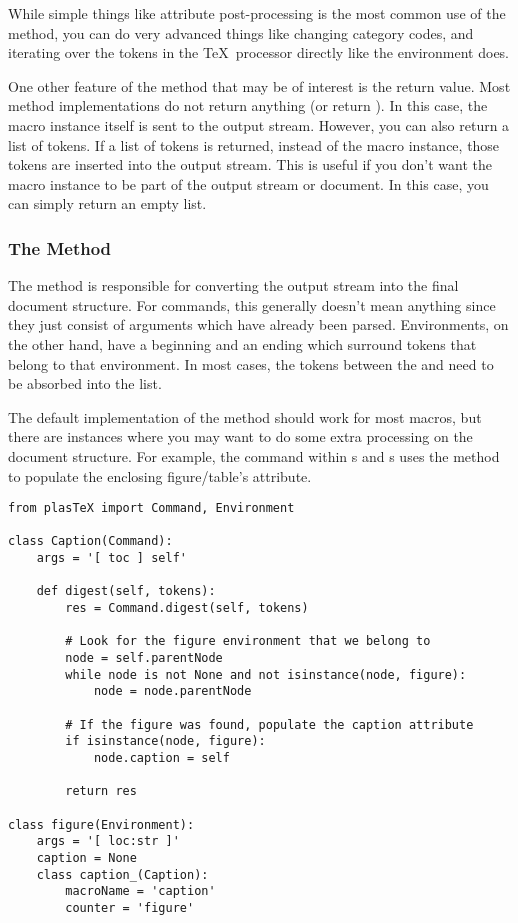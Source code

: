 While simple things like attribute post-processing is the most common
use of the  method, you can do very advanced things
like changing category codes, and iterating over the tokens in the
\TeX\ processor directly like the  environment
does.

One other feature of the  method that may be of interest
is the return value.  Most  method implementations do
not return anything (or return ).  In this case, the macro
instance itself is sent to the output stream.  However, you can also
return a list of tokens.  If a list of tokens is returned, instead of
the macro instance, those tokens are inserted into the output stream.
This is useful if you don't want the macro instance to be part of the
output stream or document.  In this case, you can simply return an
empty list.


\subsubsection{The  Method}

The  method is responsible for converting the output
stream into the final document structure.  For commands, this generally
doesn't mean anything since they just consist of arguments which
have already been parsed.  Environments, on the other hand, have a
beginning and an ending which surround tokens that belong to that
environment.  In most cases, the tokens between the 
and  need to be absorbed into the 
list.

The default implementation of the  method should work
for most macros, but there are instances where you may want to
do some extra processing on the document structure.  For example,
the  command within s and
s uses the  method to populate
the enclosing figure/table's  attribute.
\begin{verbatim}
from plasTeX import Command, Environment

class Caption(Command):
    args = '[ toc ] self'

    def digest(self, tokens):
        res = Command.digest(self, tokens)

        # Look for the figure environment that we belong to
        node = self.parentNode
        while node is not None and not isinstance(node, figure):
            node = node.parentNode

        # If the figure was found, populate the caption attribute
        if isinstance(node, figure):
            node.caption = self

        return res

class figure(Environment):
    args = '[ loc:str ]'
    caption = None
    class caption_(Caption):
        macroName = 'caption'
        counter = 'figure'
\end{verbatim}

